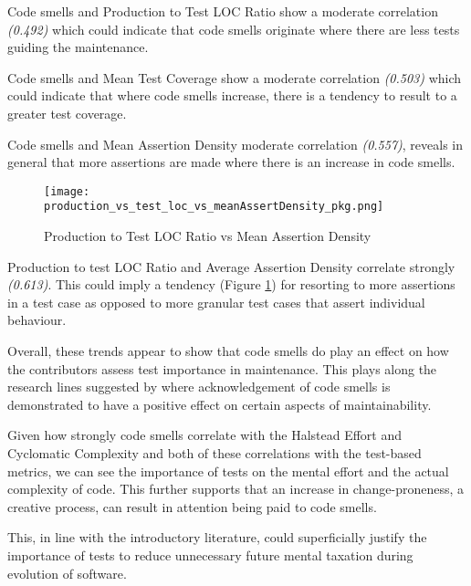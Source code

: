 Code smells and Production to Test LOC Ratio show a moderate correlation \textit{(0.492)} which could indicate that code smells originate where there are less tests guiding the maintenance. 

Code smells and Mean Test Coverage show a moderate correlation \textit{(0.503)} which could indicate that where code smells increase, there is a tendency to result to a greater test coverage. 

Code smells and Mean Assertion Density moderate correlation \textit{(0.557)}, reveals in general that more assertions are made where there is an increase in code smells. 

\begin{figure}[H]
	\texttt{[image: production\_vs\_test\_loc\_vs\_meanAssertDensity\_pkg.png]}
	\caption{Production to Test LOC Ratio vs Mean Assertion Density}
	\label{fig:prodtestRatioVsMeanAssertDensity}  
\end{figure}

Production to test LOC Ratio and Average Assertion Density correlate strongly \textit{(0.613)}. This could imply a tendency (Figure \ref{fig:prodtestRatioVsMeanAssertDensity}) for resorting to more assertions in a test case as opposed to more granular test cases that assert individual behaviour.

Overall, these trends appear to show that code smells do play an effect on how the contributors assess test importance in maintenance. This plays along the research lines suggested by \textcite{palomba2018diffuseness} where acknowledgement of code smells is demonstrated to have a positive effect on certain aspects of maintainability.

Given how strongly code smells correlate with the Halstead Effort and Cyclomatic Complexity and both of these correlations with the test-based metrics, we can see the importance of tests on the mental effort and the actual complexity of code. This further supports that an increase in change-proneness, a creative process, can result in attention being paid to code smells. 

This, in line with the introductory literature, could superficially justify the importance of tests to reduce unnecessary future mental taxation during evolution of software. 